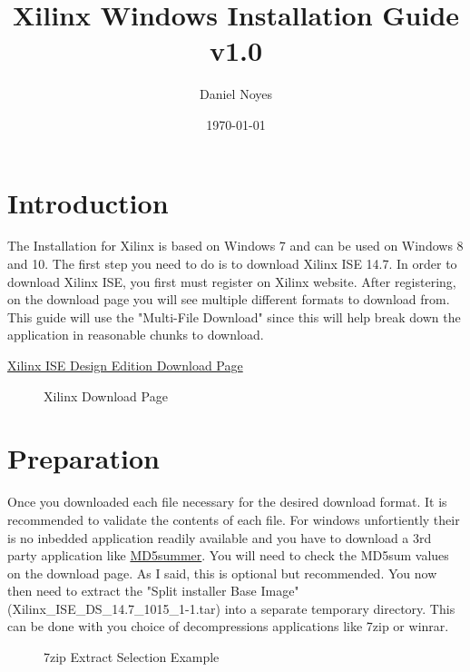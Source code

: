 \documentclass[letter]{article}
\begin{document}
\title{Xilinx Windows Installation Guide\\v1.0}
\author{Daniel Noyes}
\date{\today}
\maketitle

\section{Introduction}
The Installation for Xilinx is based on Windows 7 and can be used on Windows 8 and 10. The first step you need to do is to download Xilinx ISE 14.7. In order to download Xilinx ISE, you first must register on Xilinx website. After registering, on the download page you will see multiple different formats to download from. This guide will use the "Multi-File Download" since this will help break down the application in reasonable chunks to download.

\begin{center}
	\href{http://www.xilinx.com/support/download/index.html/content/xilinx/en/downloadNav/design-tools.html}{Xilinx ISE Design Edition Download Page}
\end{center}

\begin{figure}[!htbp]
  \centering
  \caption{\texttrademark Xilinx Download Page}
\end{figure}

\section{Preparation}
Once you downloaded each file necessary for the desired download format. It is recommended to validate the contents of each file. For windows unfortiently their is no inbedded application readily available and you have to download a 3rd party application like \href{http://www.md5summer.org/}{MD5summer}. You will need to check the MD5sum values on the download page. As I said, this is optional but recommended. You now then need to extract the "Split installer Base Image"(Xilinx\_ISE\_DS\_14.7\_1015\_1-1.tar) into a separate temporary directory. This can be done with you choice of decompressions applications like 7zip or winrar.

\begin{figure}[!htbp]
  \centering
  \caption{7zip Extract Selection Example}
\end{figure}
\end{document}
